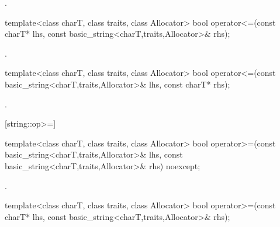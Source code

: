 \begin{itemdescr}
\pnum
\returns
{}.
\end{itemdescr}

%
%
\begin{itemdecl}
template<class charT, class traits, class Allocator>
  bool operator<=(const charT* lhs,
                  const basic_string<charT,traits,Allocator>& rhs);
\end{itemdecl}

\begin{itemdescr}
\pnum
\returns
{}.
\end{itemdescr}

%
%
\begin{itemdecl}
template<class charT, class traits, class Allocator>
  bool operator<=(const basic_string<charT,traits,Allocator>& lhs,
                  const charT* rhs);
\end{itemdecl}

\begin{itemdescr}
\pnum
\returns
{}.
\end{itemdescr}

[string::op>=]{}

%
%
\begin{itemdecl}
template<class charT, class traits, class Allocator>
  bool operator>=(const basic_string<charT,traits,Allocator>& lhs,
                  const basic_string<charT,traits,Allocator>& rhs) noexcept;
\end{itemdecl}

\begin{itemdescr}
\pnum
\returns
{}.
\end{itemdescr}

%
%
\begin{itemdecl}
template<class charT, class traits, class Allocator>
  bool operator>=(const charT* lhs,
                  const basic_string<charT,traits,Allocator>& rhs);
\end{itemdecl}

